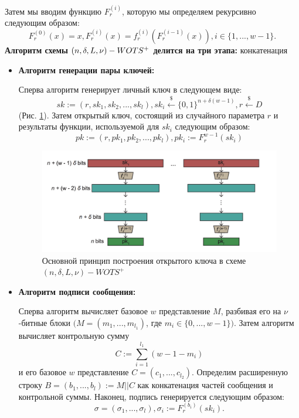 \documentclass[a4paper, 14pt]{extarticle}
\begin{document}
Затем мы вводим функцию $F^{(i)}_{r}$, которую мы определяем рекурсивно следующим образом:
\[F^{(0)}_{r}(x) = x, F^{(i)}_{r}(x) = f^{(i)}_{r}(F^{(i - 1)}_{r}(x)), i \in \{1, ..., w - 1\}.\]
\newpage %
\textbf{Алгоритм схемы $(n, \delta, L, \nu)-W\-OTS^{+}$ делится на три этапа:}
конкатенация
\begin{itemize}
    \item \textbf{Алгоритм генерации пары ключей:}

    Сперва алгоритм генерирует личный ключ в следующем виде:
    \[sk := (r, sk_{1}, sk_{2}, ..., sk_{l}), sk_{i} \stackrel{\$}{\leftarrow} \{0, 1\}^{n+\delta(w - 1)}, r \stackrel{\$}{\leftarrow} D\]
    (Рис. \ref{fig:wots1}). Затем открытый ключ, состоящий из случайного параметра $r$ и результаты функции, используемой для $sk_{i}$ следующим образом:
    \[ pk := (r, pk_{1}, pk_{2}, ..., pk_{l}), pk_{i} := F^{w - 1}_{r}(sk_{i})\]

    \begin{figure}[h]
        \centering
        \includegraphics[scale=0.78]{WOTS+_1.png}
        \caption{Основной принцип построения открытого ключа в схеме $(n, \delta, L, \nu)-WOTS^{+}$ }
        \label{fig:wots1}
    \end{figure}

    \item \textbf{Алгоритм подписи сообщения:}

    Сперва алгоритм вычисляет базовое $w$ представление $M$, разбивая его на $\nu$-битные блоки $(M = (m_{1}, ..., m_{l_{1}})$, где $m_{i} \in \{0, ..., w - 1\})$. Затем алгоритм вычисляет контрольную сумму
    \[ C := \sum^{l_{1}}_{i = 1}(w - 1 - m_{i}) \]
    и его базовое $w$ представление $C = (c_{1}, ..., c_{l_{2}})$. Определим расширенную строку $B = (b_{1}, ..., b_{l}) := M||C$ как конкатенация частей сообщения и контрольной суммы. Наконец, подпись генерируется следующим образом:
    \[ \sigma = (\sigma_{1}, ..., \sigma_{l}), \sigma_{i} := F^{(b_{i})}_{r}(sk_{i}). \]


\end{itemize}
\end{document}
